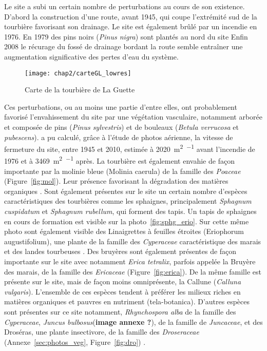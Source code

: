 Le site a subi un certain nombre de perturbations au cours de son existence.
D'abord la construction d'une route, avant 1945, qui coupe l'extrémité sud de la tourbière favorisant son drainage.
Le site est également brûlé par un incendie en 1976.
En 1979 des pins noirs (\textit{Pinus nigra}) sont plantés au nord du site
Enfin 2008 le récurage du fossé de drainage bordant la route semble entraîner une augmentation significative des pertes d'eau du système.

\begin{figure}
\texttt{[image: chap2/carteGL\_lowres]}
\caption{Carte de la tourbière de La Guette}
\label{fig:carte_LG}
\end{figure}

Ces perturbations, ou au moins une partie d'entre elles, ont probablement favorisé l'envahissement du site par une végétation vasculaire, notamment arborée et composée de pins (\textit{Pinus sylvestris}) et de bouleaux (\textit{Betula verrucosa} et \textit{pubescens}).
\citet{viel2015} a pu calculé, grâce à l'étude de photos aérienne, la vitesse de fermeture du site, entre 1945 et 2010, estimée à \SI{2020}{\square\metre\per\year} avant l'incendie de 1976 et à \SI{3469}{\square\metre\per\year} après.
La tourbière est également envahie de façon importante par la molinie bleue (Molinia caerula) de la famille des \textit{Poaceae} (Figure~\ref{fig:mol}).
Leur présence favorisant la dégradation des matières organiques \citep{gogo2011}.
Sont également présentes sur le site un certain nombre d'espèces caractéristiques des tourbières comme les sphaignes, principalement \textit{Sphagnum cuspidatum} et \textit{Sphagnum rubellum}, qui forment des tapis.
Un tapis de sphaignes en cours de formation est visible sur la photo~\ref{fig:sphg_erio}.
Sur cette même photo sont également visible des Linaigrettes à feuilles étroites (Eriophorum augustifolium), une plante de la famille des \textit{Cyperaceae} caractéristique des marais et des landes tourbeuses \citep{rameau2008}.
Des bruyères sont également présentes de façon importante sur le site avec notamment \textit{Erica tetralix}, parfois appelée la Bruyère des marais, de la famille des \textit{Ericaceae} (Figure~\ref{fig:erica}).
De la même famille est présente sur le site, mais de façon moins omniprésente, la Callune (\textit{Calluna vulgaris}).
L'ensemble de ces espèces tendent à préférer les milieux riches en matières organiques et pauvres en nutriment (tela-botanica).
D'autres espèces sont présentes sur ce site notamment, \textit{Rhynchospora alba} de la famille des \textit{Cyperaceae}, \textit{Juncus bulbosus}(\textbf{image annexe ?}), de la famille de \textit{Juncaceae}, et des Droséras, une plante insectivore, de la famille des \textit{Droseraceae} (Annexe~\ref{sec:photos_veg}, Figure~\ref{fig:dro}) . 

